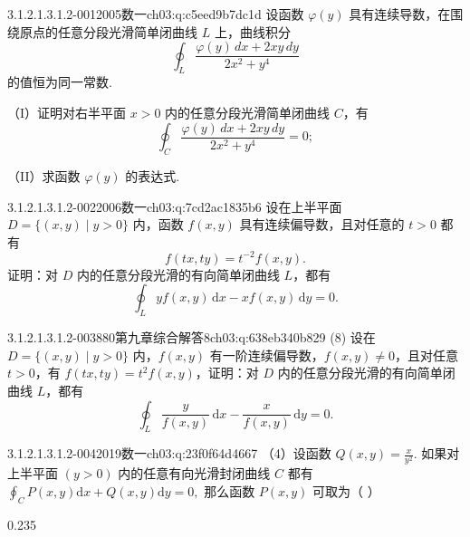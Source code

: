 \par\addvspace{2.4ex}\noindent
\begin{minipage}{\linewidth}

\begin{q}{3.1.2.1.3.1.2-001}{2005数一}{ch03:q:c5eed9b7dc1d}
设函数 $\varphi(y)$ 具有连续导数，在围绕原点的任意分段光滑简单闭曲线 $L$ 上，曲线积分
\[
\oint_L \frac{\varphi(y)\,dx+2xy\,dy}{2x^2+y^4}
\]
的值恒为同一常数.

（I）证明对右半平面 $x>0$ 内的任意分段光滑简单闭曲线 $C$，有
\[
\oint_C \frac{\varphi(y)\,dx+2xy\,dy}{2x^2+y^4}=0;
\]

（II）求函数 $\varphi(y)$ 的表达式.
\end{q}
\end{minipage}


\begin{q}{3.1.2.1.3.1.2-002}{2006数一}{ch03:q:7cd2ac1835b6}
设在上半平面 $D=\{(x,y)\mid y>0\}$ 内，函数 $f(x,y)$ 具有连续偏导数，且对任意的 $t>0$ 都有
\[ f(tx,ty)=t^{-2}f(x,y). \]
证明：对 $D$ 内的任意分段光滑的有向简单闭曲线 $L$，都有
\[ \oint_L y f(x,y)\,\mathrm{d}x - x f(x,y)\,\mathrm{d}y=0. \]
\end{q}

\begin{q}{3.1.2.1.3.1.2-003}{880第九章综合解答8}{ch03:q:638eb340b829}
(8) 设在 $D=\{(x,y)\mid y>0\}$ 内，$f(x,y)$ 有一阶连续偏导数，$f(x,y)\neq 0$，且对任意 $t>0$，有 $f(tx,ty)=t^2 f(x,y)$，证明：对 $D$ 内的任意分段光滑的有向简单闭曲线 $L$，都有 \[\oint_L \frac{y}{f(x,y)}\,\mathrm{d}x-\frac{x}{f(x,y)}\,\mathrm{d}y=0.\]
\end{q}

\begin{q}{3.1.2.1.3.1.2-004}{2019数一}{ch03:q:23f0f64d4667}
（4）设函数 $Q(x,y)=\frac{x}{y^2}$. 如果对上半平面 $(y>0)$ 内的任意有向光滑封闭曲线 $C$ 都有
$\displaystyle \oint_C P(x,y)\mathrm{d}x+Q(x,y)\mathrm{d}y=0,$
那么函数 $P(x,y)$ 可取为（ ）
\begin{opts}{0.235}
\hfill{}\hfill{}\hfill{}
\end{opts}
\end{q}

